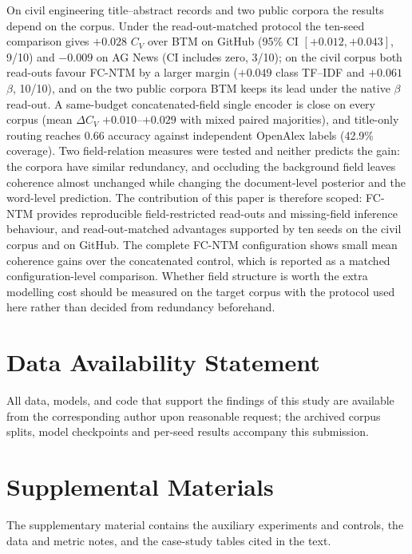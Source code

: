 \documentclass[Journal,letterpaper]{ascelike-new}
\newcommand{\fcntm}{FC-NTM}
\begin{document}
On civil engineering title--abstract records and two public corpora the results depend on the
corpus. Under the read-out-matched protocol the ten-seed comparison gives $+0.028$ $C_V$ over BTM on
GitHub (95\% CI $[+0.012,+0.043]$, 9/10) and $-0.009$ on AG News (CI includes zero, 3/10); on the
civil corpus both read-outs favour \fcntm{} by a larger margin ($+0.049$ class TF--IDF and
$+0.061$ $\beta$, 10/10), and on the two public corpora BTM keeps its lead under the native $\beta$ read-out. A same-budget concatenated-field single encoder is close on every corpus (mean
$\Delta C_V$ $+0.010$--$+0.029$ with mixed paired majorities), and title-only routing reaches
0.66 accuracy against independent OpenAlex labels (42.9\% coverage). Two field-relation measures were tested and
neither predicts the gain: the corpora have similar redundancy, and occluding the background field
leaves coherence almost unchanged while changing the document-level posterior and the word-level
prediction. The contribution of this paper is therefore scoped: \fcntm{} provides reproducible
field-restricted read-outs and missing-field inference behaviour, and read-out-matched advantages
supported by ten seeds on the civil corpus and on GitHub. The complete \fcntm{} configuration shows
small mean coherence gains over the concatenated control, which is reported as a matched configuration-level comparison. Whether field structure
is worth the extra modelling cost should be measured on the target corpus with the protocol used
here rather than decided from redundancy beforehand.

\section{Data Availability Statement}

All data, models, and code that support the findings of this study are available from the
corresponding author upon reasonable request; the archived corpus splits, model checkpoints and
per-seed results accompany this submission.

\section{Supplemental Materials}

The supplementary material contains the auxiliary experiments and controls, the data and metric
notes, and the case-study tables cited in the text.


\end{document}
